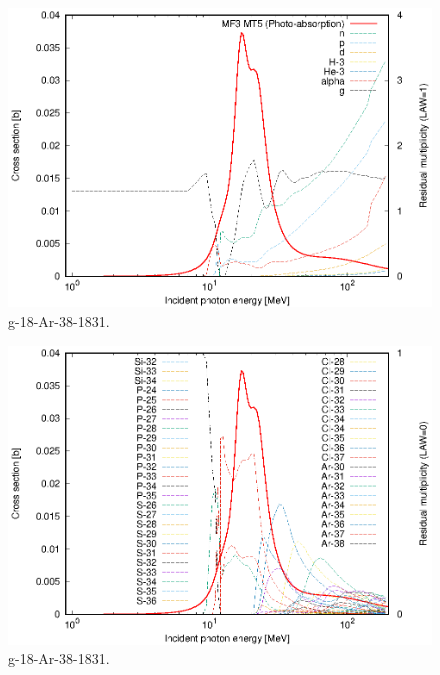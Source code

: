 \begin{figure}
 \includegraphics[width=\linewidth]{eps/g_18-Ar-38_1831.eps}
  \caption{g-18-Ar-38-1831.}
\end{figure}
\begin{figure}
 \includegraphics[width=\linewidth]{eps-law0/g_18-Ar-38_1831.eps}
 \caption{g-18-Ar-38-1831.}
\end{figure}
\newpage \clearpage

